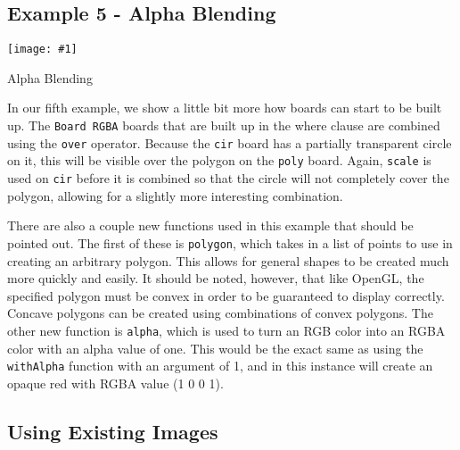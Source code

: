 \documentclass{article}
\newcommand{\floatimg}[3]{%
\begin{floatingfigure}[r]{0.35\textwidth} 
\texttt{[image: \#1]}
\caption{#2}\label{#3}
\end{floatingfigure}}
\begin{document}
\newpage
\subsection{Example 5 - Alpha Blending}

\floatimg{ex5.png}{Alpha Blending}{fig:ex5}%
In our fifth example, we show a little bit more how boards can start to be built up. The
\texttt{Board RGBA} boards that are built up in the where clause are combined using the
\texttt{over} operator. Because the \texttt{cir} board has a partially transparent circle
on it, this will be visible over the polygon on the \texttt{poly} board. Again, \texttt{scale}
is used on \texttt{cir} before it is combined so that the circle will not completely cover
the polygon, allowing for a slightly more interesting combination.

There are also a couple new functions used in this example that should be pointed out. The
first of these is \texttt{polygon}, which takes in a list of points to use in creating an
arbitrary polygon. This allows for general shapes to be created much more quickly and easily.
It should be noted, however, that like OpenGL, the specified polygon must be convex in order
to be guaranteed to display correctly. Concave polygons can be created using combinations of
convex polygons. The other new function is \texttt{alpha}, which is used to turn an RGB color
into an RGBA color with an alpha value of one. This would be the exact same as using the
\texttt{withAlpha} function with an argument of 1, and in this instance will create an opaque
red with RGBA value (1 0 0 1).

\vspace{0.1in}




\newpage
\subsection{Using Existing Images}
\end{document}
